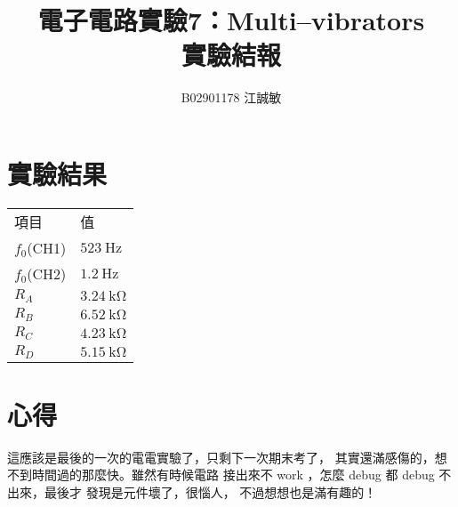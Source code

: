 \documentclass[12pt, a4paper]{article}
\title{ \bf {\Huge 電子電路實驗7：Multi–vibrators}\\ 實驗結報}
\author{B02901178 江誠敏}
\begin{document}
\maketitle


\section{實驗結果}
\begin{center}
\begin{tabular}{p{3cm}p{3cm}}
	\hline
  項目 & 值\\
	\hhline{==}
  $f_0$(CH1) & $\SI{523}\Hz$ \\
  \hline
  $f_0$(CH2) & $\SI{1.2}\Hz$ \\
  \hline
  $R_A$ & $\SI{3.24}\kohm$ \\
  \hline
  $R_B$ & $\SI{6.52}\kohm$ \\
  \hline
  $R_C$ & $\SI{4.23}\kohm$ \\
  \hline
  $R_D$ & $\SI{5.15}\kohm$ \\
  \hline
\end{tabular}
\end{center}

\section{心得}
這應該是最後的一次的電電實驗了，只剩下一次期末考了，
其實還滿感傷的，想不到時間過的那麼快。雖然有時候電路
接出來不 work ，怎麼 debug 都 debug 不出來，最後才
發現是元件壞了，很惱人， 不過想想也是滿有趣的！
\end{document}
